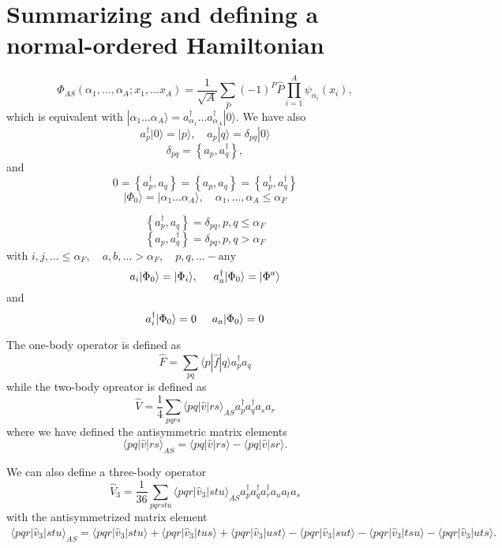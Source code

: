 \documentclass[graybox,sectrefs,envcountresetchap,open=right]{svmonodo}
\begin{document}
\section{Summarizing and defining a normal-ordered Hamiltonian}

\[
  \Phi_{AS}(\alpha_1, \dots, \alpha_A; x_1, \dots x_A)=
            \frac{1}{\sqrt{A}} \sum_{\hat{P}} (-1)^P \hat{P} \prod_{i=1}^A \psi_{\alpha_i}(x_i),
\]
which is equivalent with $|\alpha_1 \dots \alpha_A\rangle= a_{\alpha_1}^{\dagger} \dots a_{\alpha_A}^{\dagger} |0\rangle$. We have also
    \[
        a_p^\dagger|0\rangle = |p\rangle, \quad a_p |q\rangle = \delta_{pq}|0\rangle
    \]
\[
  \delta_{pq} = \left\{a_p, a_q^\dagger \right\},
\]
and 
\[
0 = \left\{a_p^\dagger, a_q \right\} = \left\{a_p, a_q \right\} = \left\{a_p^\dagger, a_q^\dagger \right\}
\]
\[
|\Phi_0\rangle = |\alpha_1 \dots \alpha_A\rangle, \quad \alpha_1, \dots, \alpha_A \leq \alpha_F
\]



\[
\left\{a_p^\dagger, a_q \right\}= \delta_{pq}, p, q \leq \alpha_F 
\]
\[
\left\{a_p, a_q^\dagger \right\} = \delta_{pq}, p, q > \alpha_F
\]
with         $i,j,\ldots \leq \alpha_F, \quad a,b,\ldots > \alpha_F, \quad p,q, \ldots - \textrm{any}$
\[
        a_i|\Phi_0\rangle = |\Phi_i\rangle, \hspace{0.5cm} a_a^\dagger|\Phi_0\rangle = |\Phi^a\rangle
\]
and         
\[
a_i^\dagger|\Phi_0\rangle = 0 \hspace{0.5cm}  a_a|\Phi_0\rangle = 0
\]




The one-body operator is defined as
\[
 \hat{F} = \sum_{pq} \langle p|\hat{f}|q\rangle a_p^\dagger a_q
\]
while the two-body opreator is defined as
\[
\hat{V} = \frac{1}{4} \sum_{pqrs} \langle pq|\hat{v}|rs\rangle_{AS} a_p^\dagger a_q^\dagger a_s a_r
\]
where we have defined the antisymmetric matrix elements
\[
\langle pq|\hat{v}|rs\rangle_{AS} = \langle pq|\hat{v}|rs\rangle - \langle pq|\hat{v}|sr\rangle.
\]

We can also define a three-body operator
\[
\hat{V}_3 = \frac{1}{36} \sum_{pqrstu} \langle pqr|\hat{v}_3|stu\rangle_{AS} 
                a_p^\dagger a_q^\dagger a_r^\dagger a_u a_t a_s
\]
with the antisymmetrized matrix element
\begin{align}
            \langle pqr|\hat{v}_3|stu\rangle_{AS} = \langle pqr|\hat{v}_3|stu\rangle + \langle pqr|\hat{v}_3|tus\rangle + \langle pqr|\hat{v}_3|ust\rangle- \langle pqr|\hat{v}_3|sut\rangle - \langle pqr|\hat{v}_3|tsu\rangle - \langle pqr|\hat{v}_3|uts\rangle.
\end{align}
\end{document}
